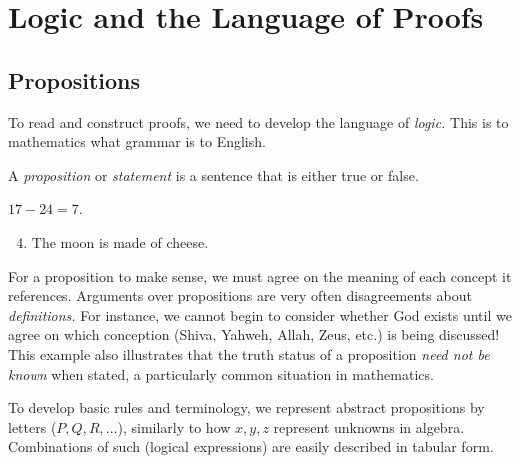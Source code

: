 \section{Logic and the Language of Proofs}\label{chap:logic}

\subsection{Propositions}\label{sec:prop}

To read and construct proofs, we need to develop the language of \emph{logic.} This is to mathematics what grammar is to English.


\begin{defn}{}{}
	A \emph{proposition} or \emph{statement} is a sentence that is either true or false.
\end{defn}

\begin{examples}{}{}
	\exstart $17-24=7$. \hfill {}
	\begin{enumerate}\setcounter{enumi}{3}\itemsep0pt
		\item The moon is made of cheese. \hfill {}
	\end{enumerate}
\end{examples}

For a proposition to make sense, we must agree on the meaning of each concept it references. Arguments over propositions are very often disagreements about \emph{definitions.} For instance, we cannot begin to consider whether God exists until we agree on which conception (Shiva, Yahweh, Allah, Zeus, etc.) is being discussed! This example also illustrates that the truth status of a proposition \emph{need not be known} when stated, a particularly common situation in mathematics.%




To develop basic rules and terminology, we represent abstract propositions by letters ($P,Q,R,\ldots$), similarly to how $x,y,z$ represent unknowns in algebra. Combinations of such (logical expressions) are easily described in tabular form.

